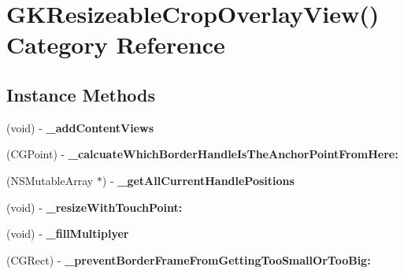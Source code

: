 \hypertarget{category_g_k_resizeable_crop_overlay_view_07_08}{}\section{G\+K\+Resizeable\+Crop\+Overlay\+View() Category Reference}
\label{category_g_k_resizeable_crop_overlay_view_07_08}
\subsection*{Instance Methods}
\begin{DoxyCompactItemize}
\item 
\hypertarget{category_g_k_resizeable_crop_overlay_view_07_08_a412a11fe36e86a205a5dbaabf80571a3}{}(void) -\/ {\bfseries \+\_\+add\+Content\+Views}\label{category_g_k_resizeable_crop_overlay_view_07_08_a412a11fe36e86a205a5dbaabf80571a3}

\item 
\hypertarget{category_g_k_resizeable_crop_overlay_view_07_08_abcd25202604e8f77894d1f07532474fd}{}(C\+G\+Point) -\/ {\bfseries \+\_\+calcuate\+Which\+Border\+Handle\+Is\+The\+Anchor\+Point\+From\+Here\+:}\label{category_g_k_resizeable_crop_overlay_view_07_08_abcd25202604e8f77894d1f07532474fd}

\item 
\hypertarget{category_g_k_resizeable_crop_overlay_view_07_08_a9097d3585edd7fc3d37606dd86174d8b}{}(N\+S\+Mutable\+Array $\ast$) -\/ {\bfseries \+\_\+get\+All\+Current\+Handle\+Positions}\label{category_g_k_resizeable_crop_overlay_view_07_08_a9097d3585edd7fc3d37606dd86174d8b}

\item 
\hypertarget{category_g_k_resizeable_crop_overlay_view_07_08_a067255dc3f2cfe6fa32e210ee9952c7f}{}(void) -\/ {\bfseries \+\_\+resize\+With\+Touch\+Point\+:}\label{category_g_k_resizeable_crop_overlay_view_07_08_a067255dc3f2cfe6fa32e210ee9952c7f}

\item 
\hypertarget{category_g_k_resizeable_crop_overlay_view_07_08_a8730b93a11657d1f53ff765676294a89}{}(void) -\/ {\bfseries \+\_\+fill\+Multiplyer}\label{category_g_k_resizeable_crop_overlay_view_07_08_a8730b93a11657d1f53ff765676294a89}

\item 
\hypertarget{category_g_k_resizeable_crop_overlay_view_07_08_a56fb99bee6248a20568c77ab2c552d1f}{}(C\+G\+Rect) -\/ {\bfseries \+\_\+prevent\+Border\+Frame\+From\+Getting\+Too\+Small\+Or\+Too\+Big\+:}\label{category_g_k_resizeable_crop_overlay_view_07_08_a56fb99bee6248a20568c77ab2c552d1f}

\end{DoxyCompactItemize}
